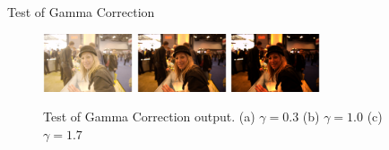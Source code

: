 \documentclass[final]{beamer}
\begin{document}
\begin{frame}{}
\begin{columns}[t]
\begin{column}{.48\linewidth}
        \begin{block}{Test of Gamma Correction}
          \begin{figure}\label{gammatest}
            \centering
            \subfigure
            {
                \includegraphics[width=100px]{gammacorrectionlow}
            }
            \subfigure
            {
                \includegraphics[width=100px]{gammacorrection_normal}
            }
            \subfigure
            {
                \includegraphics[width=100px]{gammacorrectionhigh}
            }
            \caption{
                Test of Gamma Correction output. 
                (a) $\gamma = 0.3$
                (b) $\gamma = 1.0$
                (c) $\gamma = 1.7$
            }
         \end{figure}
        \end{block}


      \end{column}


      \begin{column}{.48\linewidth}



\end{column}
\end{columns}
\end{frame}
\end{document}
